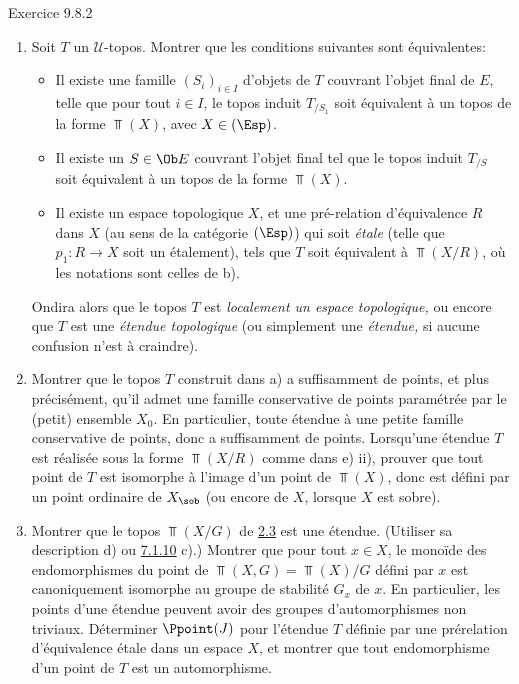 \documentclass[10pt]{../fichiers-configuration-latex/smfart}
\begin{document}
\begin{enonce*}[remark]{Exercice 9.8.2}
\begin{enumerate}
\item Soit $T$ un $𝒰$-topos. Montrer que les conditions suivantes
sont équivalentes:
\begin{itemize}
\item[(i)] Il existe une famille $(S_i)_{i\in I}$ d'objets de $T$
couvrant l'objet final de $E$, telle que pour tout $i\in I$, le
topos induit $T_{/S_1}$ soit équivalent à un topos de la forme
$\Top(X)$, avec $X\in(\Esp)$.

\item[${\rm (i')}$] Il existe un $S\in \Ob E$ couvrant l'objet final
tel que le topos induit $T_{/S}$ soit équivalent à un topos de la
forme $\Top(X)$.

\item[(ii)] Il existe un espace topologique $X$, et une pré-relation
d'équivalence $R$ dans $X$ (au sens de la catégorie $(\Esp)$) qui
soit \emph{étale} (\ie telle que $p_1:R\rightarrow X$ soit un
étalement), tels que $T$ soit équivalent à $\Top(X/R)$, où les
notations sont celles de b).
\end{itemize}

On\pageoriginale dira alors que le topos $T$ est \emph{localement un
espace topologique,} ou encore que $T$ est une \emph{étendue
topologique} (ou simplement une \emph{étendue,} si aucune confusion
n'est à craindre).

\item Montrer que le topos $T$ construit dans a) a suffisamment de
points, et plus précisément, qu'il admet une famille conservative de
points paramétrée par le (petit) ensemble $X_0$. En particulier,
toute étendue à une petite famille conservative de points, donc a
suffisamment de points. Lorsqu'une étendue $T$ est réalisée sous la
forme $\Top(X/R)$ comme dans e) ii), prouver que tout point de $T$
est isomorphe à l'image d'un point de $\Top(X)$, donc est défini par
un point ordinaire de $X_{\sob}$ (ou encore de $X$, lorsque $X$ est
sobre).

\item Montrer que le topos $\Top(X/G)$ de \hyperref[IV.subsec2.3]{2.3} est une
étendue. (Utiliser sa description d) ou \hyperref[IV.exer7.1.10]{7.1.10} c).)
Montrer que pour tout $x\in X$, le monoïde des endomorphismes du
point de $\Top(X,G)=\Top(X)/G$ défini par $x$ est canoniquement
isomorphe au groupe de stabilité $G_x$ de $x$. En particulier, les
points d'une étendue peuvent avoir des groupes d'automorphismes non
triviaux. Déterminer $\Ppoint(J)$ pour l'étendue $T$ définie par une
prérelation d'équivalence étale dans un espace $X$, et montrer que
tout endomorphisme d'un point de $T$ est un automorphisme.


\end{enumerate}
\end{enonce*}
\end{document}

